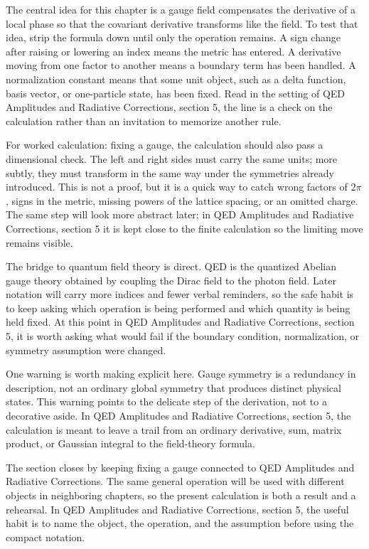 The central idea for this chapter is a gauge field compensates the derivative of a local phase so that the covariant derivative transforms like the field.  To test that idea, strip the formula down until only the operation remains.  A sign change after raising or lowering an index means the metric has entered.  A derivative moving from one factor to another means a boundary term has been handled.  A normalization constant means that some unit object, such as a delta function, basis vector, or one-particle state, has been fixed.  Read in the setting of QED Amplitudes and Radiative Corrections, section 5, the line is a check on the calculation rather than an invitation to memorize another rule.

For worked calculation: fixing a gauge, the calculation should also pass a dimensional check.  The left and right sides must carry the same units; more subtly, they must transform in the same way under the symmetries already introduced.  This is not a proof, but it is a quick way to catch wrong factors of \(2\pi\), signs in the metric, missing powers of the lattice spacing, or an omitted charge.  The same step will look more abstract later; in QED Amplitudes and Radiative Corrections, section 5 it is kept close to the finite calculation so the limiting move remains visible.

The bridge to quantum field theory is direct.  QED is the quantized Abelian gauge theory obtained by coupling the Dirac field to the photon field.  Later notation will carry more indices and fewer verbal reminders, so the safe habit is to keep asking which operation is being performed and which quantity is being held fixed.  At this point in QED Amplitudes and Radiative Corrections, section 5, it is worth asking what would fail if the boundary condition, normalization, or symmetry assumption were changed.

One warning is worth making explicit here.  Gauge symmetry is a redundancy in description, not an ordinary global symmetry that produces distinct physical states.  This warning points to the delicate step of the derivation, not to a decorative aside.  In QED Amplitudes and Radiative Corrections, section 5, the calculation is meant to leave a trail from an ordinary derivative, sum, matrix product, or Gaussian integral to the field-theory formula.

The section closes by keeping fixing a gauge connected to QED Amplitudes and Radiative Corrections.  The same general operation will be used with different objects in neighboring chapters, so the present calculation is both a result and a rehearsal.  In QED Amplitudes and Radiative Corrections, section 5, the useful habit is to name the object, the operation, and the assumption before using the compact notation.



